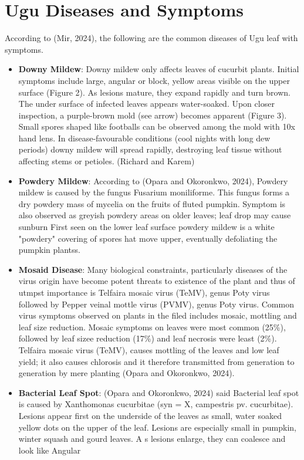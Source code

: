 \section{Ugu Diseases and Symptoms}
According to (Mir, 2024), the following are the common diseases of Ugu leaf with symptoms.
\begin{itemize}
	\item {\bfseries Downy Mildew}: Downy mildew only affects leaves of cucurbit plants. Initial symptoms include large, angular or block, yellow areas visible on the upper surface (Figure 2). As lesions mature, they expand rapidly and turn brown. The under surface of infected leaves appears water-soaked. Upon closer inspection, a purple-brown mold (see arrow) becomes apparent (Figure 3). Small spores shaped like footballs can be observed among the mold with 10x hand lens. In disease-favourable conditions (cool nights with long dew periods) downy mildew will spread rapidly, destroying leaf tissue without affecting stems or petioles. (Richard and Karem)
	
	\item {\bfseries Powdery Mildew}: According to (Opara and Okoronkwo, 2024), Powdery mildew is caused by the fungus Fusarium moniliforme. This fungus forms a dry powdery mass of mycelia on the fruits of fluted pumpkin. Symptom is also observed as greyish powdery areas on older leaves; leaf drop may cause sunburn First seen on the lower leaf surface powdery mildew is a white "powdery" covering of spores hat move upper, eventually defoliating the pumpkin plantss.
	
	\item {\bfseries Mosaid Disease}: Many biological constraints, particularly diseases of the virus origin have become potent threats to existence of the plant and thus of utmpst importance is Telfaira mosaic virus (TeMV), genus Poty virus followed by Pepper veinal mottle virus (PVMV), genus Poty virus. Common virus symptoms observed on plants in the filed includes mosaic, mottling and leaf size reduction. Mosaic symptoms on leaves  were most common (25\%), followed by leaf sizee reduction (17\%) and leaf necrosis were least (2\%). Telfaira mosaic virus (TeMV), causes mottling of the leaves and low leaf yield; it also causes chlorosis and it therefore transmitted from generation to generation by mere planting (Opara and Okoronkwo, 2024).
	
	\item {\bfseries Bacterial Leaf Spot}: (Opara and Okoronkwo, 2024) said Bacterial leaf spot is caused by Xanthomonas cucurbitae (syn = X, campestris pv. cucurbitae). Lesions appear first on the underside of the leaves as small, water soaked yellow dots on the upper of the leaf. Lesions are especially small in pumpkin, winter squash and gourd leaves. A s lesions enlarge, they can coalesce and look like Angular
\end{itemize}

